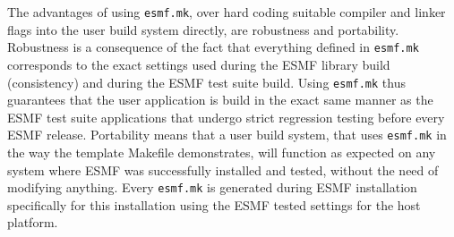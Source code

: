 The advantages of using {\tt esmf.mk}, over hard coding suitable compiler and linker flags into the user build system directly, are robustness and portability. Robustness is a consequence of the fact that everything defined in {\tt esmf.mk} corresponds to the exact settings used during the ESMF library build (consistency) and during the ESMF test suite build. Using {\tt esmf.mk} thus guarantees that the user application is build in the exact same manner as the ESMF test suite applications that undergo strict regression testing before every ESMF release. Portability means that a user build system, that uses {\tt esmf.mk} in the way the template Makefile demonstrates, will function as expected on any system where ESMF was successfully installed and tested, without the need of modifying anything. Every {\tt esmf.mk} is generated during ESMF installation specifically for this installation using the ESMF tested settings for the host platform.

